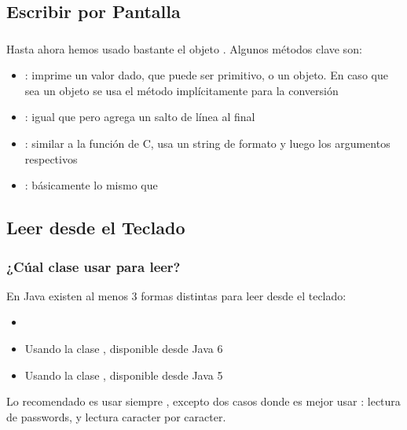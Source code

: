 \documentclass{beamer}
\begin{document}
\subsection{Escribir por Pantalla}

\begin{frame}
  \frametitle{}

  Hasta ahora hemos usado bastante el objeto
  . Algunos métodos clave son:

  \begin{itemize}
  \item {}: imprime un valor dado, que puede ser primitivo,
    o un objeto. En caso que sea un objeto se usa el método
     implícitamente para la conversión
    
  \item {}: igual que  pero agrega un salto
    de línea al final
    
  \item {}: similar a la función de C, usa un string de
    formato y luego los argumentos respectivos
  
  \item {}: básicamente lo mismo que 
    
  \end{itemize}  
\end{frame}

\subsection{Leer desde el Teclado}

\begin{frame}
  \frametitle{¿Cúal clase usar para leer?}

  En Java existen al menos 3 formas distintas para leer desde el
  teclado:

  \begin{itemize}
  \item {}    
  \item Usando la clase , disponible desde Java 6    
  \item Usando la clase , disponible desde Java 5
  \end{itemize}

  Lo recomendado es usar siempre , excepto dos casos
  donde es mejor usar : lectura de passwords, y lectura
  caracter por caracter.
  
\end{frame}
\end{document}
